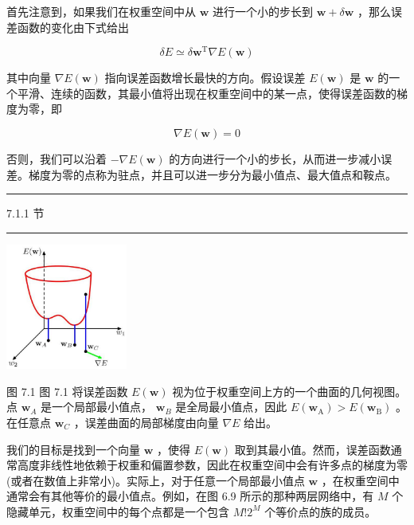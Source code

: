 \documentclass[10pt]{article}
\newcommand{\HRule}{\begin{center}\rule{0.9\linewidth}{0.2mm}\end{center}}
\begin{document}
首先注意到，如果我们在权重空间中从 \(\mathbf{w}\) 进行一个小的步长到 \(\mathbf{w} + \delta \mathbf{w}\) ，那么误差函数的变化由下式给出

\[
{\delta E} \simeq  \delta {\mathbf{w}}^{\mathrm{T}}\nabla E\left( \mathbf{w}\right)  \tag{7.1}
\]

其中向量 \(\nabla E\left( \mathbf{w}\right)\) 指向误差函数增长最快的方向。假设误差 \(E\left( \mathbf{w}\right)\) 是 \(\mathbf{w}\) 的一个平滑、连续的函数，其最小值将出现在权重空间中的某一点，使得误差函数的梯度为零，即

\[
\nabla E\left( \mathbf{w}\right)  = 0 \tag{7.2}
\]

否则，我们可以沿着 \(- \nabla E\left( \mathbf{w}\right)\) 的方向进行一个小的步长，从而进一步减小误差。梯度为零的点称为驻点，并且可以进一步分为最小值点、最大值点和鞍点。

\HRule

7.1.1 节

\HRule

\begin{center}
\includegraphics[max width=0.3\textwidth]{images/0194e279-9b28-703a-88f4-c3ac21e2010d_230_1074_344_470_486_0.jpg}
\end{center}
\hspace*{3em} 

图 7.1 图 7.1 将误差函数 \(E\left( \mathbf{w}\right)\) 视为位于权重空间上方的一个曲面的几何视图。点 \({\mathbf{w}}_{A}\) 是一个局部最小值点， \({\mathbf{w}}_{B}\) 是全局最小值点，因此 \(E\left( {\mathbf{w}}_{\mathrm{A}}\right)  > E\left( {\mathbf{w}}_{\mathrm{B}}\right)\) 。在任意点 \({\mathbf{w}}_{C}\) ，误差曲面的局部梯度由向量 \(\nabla E\) 给出。

我们的目标是找到一个向量 \(\mathbf{w}\) ，使得 \(E\left( \mathbf{w}\right)\) 取到其最小值。然而，误差函数通常高度非线性地依赖于权重和偏置参数，因此在权重空间中会有许多点的梯度为零(或者在数值上非常小)。实际上，对于任意一个局部最小值点 \(\mathbf{w}\) ，在权重空间中通常会有其他等价的最小值点。例如，在图 6.9 所示的那种两层网络中，有 \(M\) 个隐藏单元，权重空间中的每个点都是一个包含 \(M!{2}^{M}\) 个等价点的族的成员。
\end{document}
